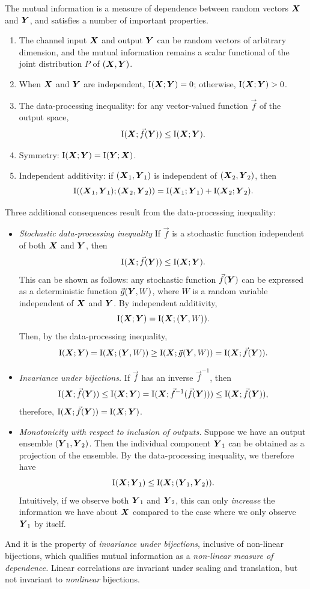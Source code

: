 The mutual information is a measure of dependence between random
vectors $\boldsymbol{X}$ and $\boldsymbol{Y}$, and satisfies a number of important
properties.
\begin{enumerate}
\item The channel input $\boldsymbol{X}$ and output $\boldsymbol{Y}$ can be random vectors of arbitrary dimension, and the mutual information remains a scalar functional of the joint distribution $P$ of $(\boldsymbol{X}, \boldsymbol{Y})$.
\item When $\boldsymbol{X}$ and $\boldsymbol{Y}$ are independent, $\text{I}(\boldsymbol{X}; \boldsymbol{Y}) = 0$; otherwise, $\text{I}(\boldsymbol{X}; \boldsymbol{Y}) > 0$.
\item The data-processing inequality: for any vector-valued function $\vec{f}$ of the output space,
\[
\text{I}(\boldsymbol{X}; \vec{f}(\boldsymbol{Y})) \leq \text{I}(\boldsymbol{X}; \boldsymbol{Y}).
\]
\item Symmetry: $\text{I}(\boldsymbol{X}; \boldsymbol{Y}) = \text{I}(\boldsymbol{Y}; \boldsymbol{X})$.
\item Independent additivity: if $(\boldsymbol{X}_1,\boldsymbol{Y}_1)$ is independent of $(\boldsymbol{X}_2, \boldsymbol{Y}_2)$, then
\[
\text{I}((\boldsymbol{X}_1,\boldsymbol{Y}_1); (\boldsymbol{X}_2, \boldsymbol{Y}_2)) = \text{I}(\boldsymbol{X}_1; \boldsymbol{Y}_1) + \text{I}(\boldsymbol{X}_2; \boldsymbol{Y}_2).
\]
\end{enumerate}
Three additional consequences result from the data-processing inequality:
\begin{itemize}
\item \emph{Stochastic data-processing inequality}  If $\vec{f}$ is a stochastic function independent of both $\boldsymbol{X}$ and $\boldsymbol{Y}$, then
\[
\text{I}(\boldsymbol{X}; \vec{f}(\boldsymbol{Y})) \leq \text{I}(\boldsymbol{X}; \boldsymbol{Y}).
\]
This can be shown as follows: any stochastic function $\vec{f}(\boldsymbol{Y})$
can be expressed as a deterministic function $\vec{g}(\boldsymbol{Y}, W)$, where
$W$ is a random variable independent of $\boldsymbol{X}$ and $\boldsymbol{Y}$.
By independent additivity,
\[
\text{I}(\boldsymbol{X}; \boldsymbol{Y}) = \text{I}(\boldsymbol{X}; (\boldsymbol{Y}, W)).
\]
Then, by the data-processing inequality,
\[
\text{I}(\boldsymbol{X}; \boldsymbol{Y}) = \text{I}(\boldsymbol{X}; (\boldsymbol{Y}, W)) \geq \text{I}(\boldsymbol{X}; \vec{g}(\boldsymbol{Y}, W)) = \text{I}(\boldsymbol{X}; \vec{f}(\boldsymbol{Y})).
\]
\item \emph{Invariance under bijections.} If $\vec{f}$ has an inverse $\vec{f}^{-1}$, then 
\[
\text{I}(\boldsymbol{X}; \vec{f}(\boldsymbol{Y})) \leq \text{I}(\boldsymbol{X}; \boldsymbol{Y}) = \text{I}(\boldsymbol{X}; \vec{f}^{-1}(\vec{f}(\boldsymbol{Y}))) \leq \text{I}(\boldsymbol{X}; \vec{f}(\boldsymbol{Y})),
\]
therefore, $\text{I}(\boldsymbol{X}; \vec{f}(\boldsymbol{Y})) = \text{I}(\boldsymbol{X}; \boldsymbol{Y})$.
\item \emph{Monotonicity with respect to inclusion of outputs.}  Suppose we have an output ensemble $(\boldsymbol{Y}_1,\boldsymbol{Y}_2)$.  Then the individual component $\boldsymbol{Y}_1$ can be obtained as a projection of the ensemble.  By the data-processing inequality, we therefore have
\[
\text{I}(\boldsymbol{X}; \boldsymbol{Y}_1) \leq \text{I}(\boldsymbol{X}; (\boldsymbol{Y}_1, \boldsymbol{Y}_2)).
\]
Intuitively, if we observe both $\boldsymbol{Y}_1$ and $\boldsymbol{Y}_2$, this can
only \emph{increase} the information we have about $\boldsymbol{X}$ compared to
the case where we only observe $\boldsymbol{Y}_1$ by itself.
\end{itemize}
And it is the property of \emph{invariance under bijections},
inclusive of non-linear bijections, which qualifies mutual information
as a \emph{non-linear measure of dependence.}  Linear correlations are
invariant under scaling and translation, but not invariant
to \emph{nonlinear} bijections.

